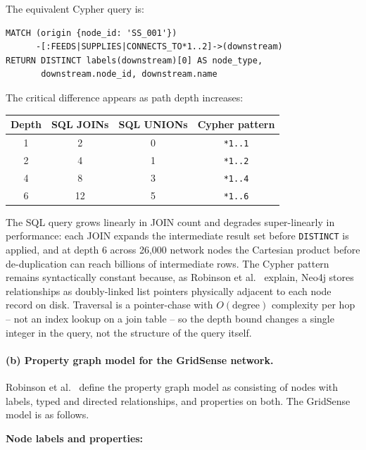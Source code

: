 \documentclass[11pt, a4paper]{article}
\makeatletter
\renewcommand{\_}{\origunderscore\penalty\z@\hskip\z@skip}
\renewcommand{\{}{\origlbrace\penalty\z@\hskip\z@skip}
\renewcommand{\}}{\origrbrace\penalty\z@\hskip\z@skip}
\makeatother
\begin{document}
The equivalent Cypher query is:

\begin{verbatim}
MATCH (origin {node_id: 'SS_001'})
      -[:FEEDS|SUPPLIES|CONNECTS_TO*1..2]->(downstream)
RETURN DISTINCT labels(downstream)[0] AS node_type,
       downstream.node_id, downstream.name
\end{verbatim}

The critical difference appears as path depth increases:

\begin{center}
\begin{tabular}{cccc}
\hline
\textbf{Depth} & \textbf{SQL JOINs} & \textbf{SQL UNIONs} &
\textbf{Cypher pattern} \\
\hline
1 & 2  & 0 & \texttt{*1..1} \\
2 & 4  & 1 & \texttt{*1..2} \\
4 & 8  & 3 & \texttt{*1..4} \\
6 & 12 & 5 & \texttt{*1..6} \\
\hline
\end{tabular}
\end{center}

The SQL query grows linearly in JOIN count and degrades super-linearly
in performance: each JOIN expands the intermediate result set before
\texttt{DISTINCT} is applied, and at depth 6 across 26,000 network
nodes the Cartesian product before de-duplication can reach billions of
intermediate rows. The Cypher pattern remains syntactically constant
because, as Robinson et al.~\cite{robinson2015} explain, Neo4j stores
relationships as doubly-linked list pointers physically adjacent to each
node record on disk. Traversal is a pointer-chase with $O(\text{degree})$
complexity per hop -- not an index lookup on a join table -- so the
depth bound changes a single integer in the query, not the structure of
the query itself.

\paragraph{(b) Property graph model for the GridSense network.}
Robinson et al.~\cite{robinson2015} define the property graph model as
consisting of nodes with labels, typed and directed relationships, and
properties on both. The GridSense model is as follows.

\textbf{Node labels and properties:}
\end{document}
